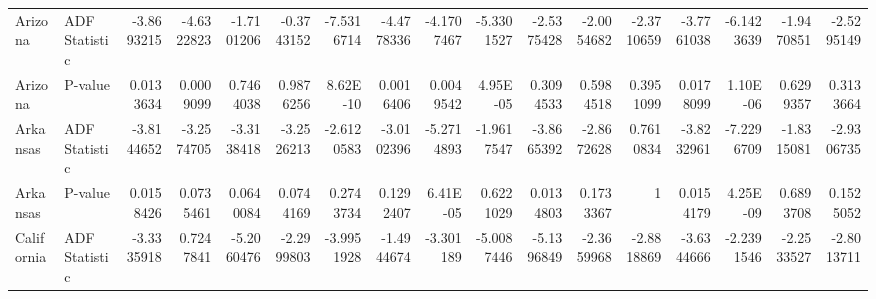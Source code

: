 \begin{table}
{\begin{tabular}{llrrrrrrrrrrrrrrr}
            Arizona     & ADF Statistic & -3.8693215                          & -4.6322823               & -1.7101206               & -0.3743152               & -7.5316714                 & -4.4778336               & -4.1707467                 & -5.3301527              & -2.5375428              & -2.0054682                 & -2.3710659                 & -3.7761038                & -6.1423639                & -1.9470851                       & -2.5295149                       \\
            Arizona     & P-value       & 0.0133634                           & 0.0009099                & 0.7464038                & 0.9876256                & 8.62E-10                   & 0.0016406                & 0.0049542                  & 4.95E-05                & 0.3094533               & 0.5984518                  & 0.3951099                  & 0.0178099                 & 1.10E-06                  & 0.6299357                        & 0.3133664                        \\
            Arkansas    & ADF Statistic & -3.8144652                          & -3.2574705               & -3.3138418               & -3.2526213               & -2.6120583                 & -3.0102396               & -5.2714893                 & -1.9617547              & -3.8665392              & -2.8672628                 & 0.7610834                  & -3.8232961                & -7.2296709                & -1.8315081                       & -2.9306735                       \\
            Arkansas    & P-value       & 0.0158426                           & 0.0735461                & 0.0640084                & 0.0744169                & 0.2743734                  & 0.1292407                & 6.41E-05                   & 0.6221029               & 0.0134803               & 0.1733367                  & 1                          & 0.0154179                 & 4.25E-09                  & 0.6893708                        & 0.1525052                        \\
            California  & ADF Statistic & -3.3335918                          & 0.7247841                & -5.2060476               & -2.2999803               & -3.9951928                 & -1.4944674               & -3.301189                  & -5.0087446              & -5.1396849              & -2.3659968                 & -2.8818869                 & -3.6344666                & -2.2391546                & -2.2533527                       & -2.8013711                       \\

\end{tabular}}
\end{table}
